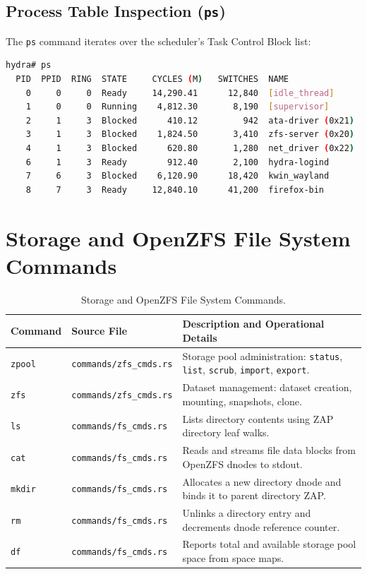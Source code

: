 \subsection{Process Table Inspection (\texttt{ps})}
The \texttt{ps} command iterates over the scheduler's Task Control Block list:
\begin{lstlisting}[language=bash]
hydra# ps
  PID  PPID  RING  STATE     CYCLES (M)   SWITCHES  NAME
    0     0     0  Ready     14,290.41      12,840  [idle_thread]
    1     0     0  Running    4,812.30       8,190  [supervisor]
    2     1     3  Blocked      410.12         942  ata-driver (0x21)
    3     1     3  Blocked    1,824.50       3,410  zfs-server (0x20)
    4     1     3  Blocked      620.80       1,280  net_driver (0x22)
    6     1     3  Ready        912.40       2,100  hydra-logind
    7     6     3  Blocked    6,120.90      18,420  kwin_wayland
    8     7     3  Ready     12,840.10      41,200  firefox-bin
\end{lstlisting}

\section{Storage and OpenZFS File System Commands}
\label{sec:shell_zfs_cmds}

\begin{table}[htbp]
\centering
\small
\begin{tabularx}{\textwidth}{llX}
\toprule
\textbf{Command} & \textbf{Source File} & \textbf{Description and Operational Details} \\
\midrule
\texttt{zpool} & \texttt{commands/zfs\_cmds.rs} & Storage pool administration: \texttt{status}, \texttt{list}, \texttt{scrub}, \texttt{import}, \texttt{export}. \\
\texttt{zfs} & \texttt{commands/zfs\_cmds.rs} & Dataset management: dataset creation, mounting, snapshots, clone. \\
\texttt{ls} & \texttt{commands/fs\_cmds.rs} & Lists directory contents using ZAP directory leaf walks. \\
\texttt{cat} & \texttt{commands/fs\_cmds.rs} & Reads and streams file data blocks from OpenZFS dnodes to stdout. \\
\texttt{mkdir} & \texttt{commands/fs\_cmds.rs} & Allocates a new directory dnode and binds it to parent directory ZAP. \\
\texttt{rm} & \texttt{commands/fs\_cmds.rs} & Unlinks a directory entry and decrements dnode reference counter. \\
\texttt{df} & \texttt{commands/fs\_cmds.rs} & Reports total and available storage pool space from space maps. \\
\bottomrule
\end{tabularx}
\caption{Storage and OpenZFS File System Commands.}
\label{tab:shell_storage_cmds}
\end{table}

